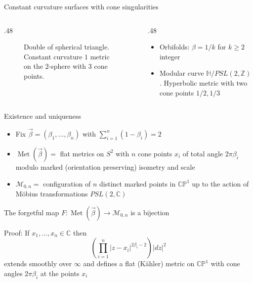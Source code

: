 \documentclass{beamer}
\newcommand{\C}{\mathbb{C}}
\newcommand{\CP}{\mathbb{CP}}
\newcommand{\mM}{\mathcal{M}}
\DeclareMathOperator{\Met}{Met}
\begin{document}
\begin{frame}{Constant curvature surfaces with cone singularities}
\begin{columns}
\begin{column}{.48\textwidth}
\begin{figure}
{		
			}
			\caption{Double of spherical triangle.  Constant curvature \(1\) metric on the \(2\)-sphere with \(3\) cone points.}
		\end{figure}
	\end{column}
	\begin{column}{.48\textwidth}
		\begin{itemize}
			\item Orbifolds: \(\beta = 1/k\) for \(k \geq 2\) integer
			\item Modular curve \(\mathbb{H}/PSL(2, \mathbb{Z})\). Hyperbolic metric with two cone points \(1/2, 1/3\)
		\end{itemize}
	\end{column}
\end{columns}
\end{frame}



\begin{frame}{Existence and uniqueness}
	\begin{itemize}
		\item Fix \(\vec{\beta} = (\beta_1, \ldots, \beta_n)\) with \(\sum_{i=1}^{n}(1-\beta_i) = 2\)
		\item \(\Met(\vec{\beta}) = \) flat metrics on \(S^2\) with \(n\) cone points \(x_i\) of total angle \(2\pi\beta_i\) modulo marked (orientation preserving) isometry and scale
		\item \(\mM_{0,n} = \) configuration of \(n\) distinct marked points in \(\CP^1\) up to the action of M\"obius transformations \(PSL(2, \C)\)
	\end{itemize}

\begin{theorem}[Troyanov]
	The forgetful map \(F: \Met(\vec{\beta}) \to \mM_{0,n}\) is a bijection
\end{theorem}

Proof: If \(x_1, \ldots, x_n \in \C\) then
\[
\left(\prod_{i=1}^{n} |z-x_i|^{2\beta_i-2}\right) |dz|^2
\]
extends smoothly over \(\infty\) and defines a flat (K\"ahler) metric on \(\CP^1\) with cone angles \(2\pi\beta_i\) at the points \(x_i\)

\end{frame}
\end{document}
